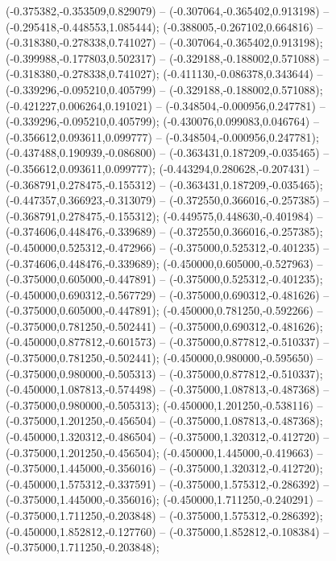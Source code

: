  (-0.375382,-0.353509,0.829079) -- (-0.307064,-0.365402,0.913198) -- (-0.295418,-0.448553,1.085444);
 (-0.388005,-0.267102,0.664816) -- (-0.318380,-0.278338,0.741027) -- (-0.307064,-0.365402,0.913198);
 (-0.399988,-0.177803,0.502317) -- (-0.329188,-0.188002,0.571088) -- (-0.318380,-0.278338,0.741027);
 (-0.411130,-0.086378,0.343644) -- (-0.339296,-0.095210,0.405799) -- (-0.329188,-0.188002,0.571088);
 (-0.421227,0.006264,0.191021) -- (-0.348504,-0.000956,0.247781) -- (-0.339296,-0.095210,0.405799);
 (-0.430076,0.099083,0.046764) -- (-0.356612,0.093611,0.099777) -- (-0.348504,-0.000956,0.247781);
 (-0.437488,0.190939,-0.086800) -- (-0.363431,0.187209,-0.035465) -- (-0.356612,0.093611,0.099777);
 (-0.443294,0.280628,-0.207431) -- (-0.368791,0.278475,-0.155312) -- (-0.363431,0.187209,-0.035465);
 (-0.447357,0.366923,-0.313079) -- (-0.372550,0.366016,-0.257385) -- (-0.368791,0.278475,-0.155312);
 (-0.449575,0.448630,-0.401984) -- (-0.374606,0.448476,-0.339689) -- (-0.372550,0.366016,-0.257385);
 (-0.450000,0.525312,-0.472966) -- (-0.375000,0.525312,-0.401235) -- (-0.374606,0.448476,-0.339689);
 (-0.450000,0.605000,-0.527963) -- (-0.375000,0.605000,-0.447891) -- (-0.375000,0.525312,-0.401235);
 (-0.450000,0.690312,-0.567729) -- (-0.375000,0.690312,-0.481626) -- (-0.375000,0.605000,-0.447891);
 (-0.450000,0.781250,-0.592266) -- (-0.375000,0.781250,-0.502441) -- (-0.375000,0.690312,-0.481626);
 (-0.450000,0.877812,-0.601573) -- (-0.375000,0.877812,-0.510337) -- (-0.375000,0.781250,-0.502441);
 (-0.450000,0.980000,-0.595650) -- (-0.375000,0.980000,-0.505313) -- (-0.375000,0.877812,-0.510337);
 (-0.450000,1.087813,-0.574498) -- (-0.375000,1.087813,-0.487368) -- (-0.375000,0.980000,-0.505313);
 (-0.450000,1.201250,-0.538116) -- (-0.375000,1.201250,-0.456504) -- (-0.375000,1.087813,-0.487368);
 (-0.450000,1.320312,-0.486504) -- (-0.375000,1.320312,-0.412720) -- (-0.375000,1.201250,-0.456504);
 (-0.450000,1.445000,-0.419663) -- (-0.375000,1.445000,-0.356016) -- (-0.375000,1.320312,-0.412720);
 (-0.450000,1.575312,-0.337591) -- (-0.375000,1.575312,-0.286392) -- (-0.375000,1.445000,-0.356016);
 (-0.450000,1.711250,-0.240291) -- (-0.375000,1.711250,-0.203848) -- (-0.375000,1.575312,-0.286392);
 (-0.450000,1.852812,-0.127760) -- (-0.375000,1.852812,-0.108384) -- (-0.375000,1.711250,-0.203848);
